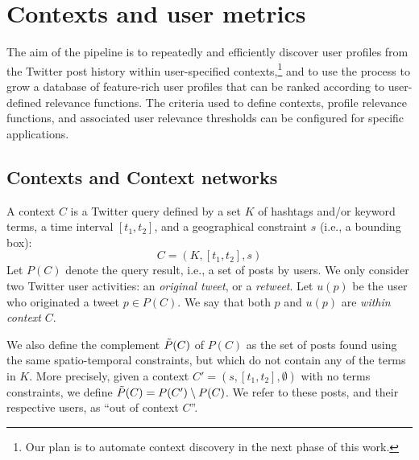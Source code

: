 \section{Contexts and user metrics}


The aim of the pipeline is to repeatedly and efficiently discover user profiles from the Twitter post history within user-specified contexts,\footnote{Our plan is to  automate context discovery in the next phase of this work.} and to use the process to grow a database of feature-rich user profiles that can be ranked according to user-defined relevance functions. 
The criteria used to define contexts, profile relevance functions, and associated user relevance thresholds can be configured for specific applications.

\subsection{Contexts and Context networks} \label{sec:contexts}

A context $C$ is a Twitter query defined by a set $K$ of hashtags and/or keyword terms, a time interval $[t_1, t_2]$, and a geographical constraint  $s$ (i.e., a bounding box):
\begin{equation}
C = (K, [t_1, t_2], s)
\label{eq:context}
\end{equation}
Let $P(C)$ denote the query result, i.e., a set of posts by users.
We only consider two Twitter user activities: an \textit{original tweet}, or a \textit{retweet}.
Let $u(p)$ be the user who originated a tweet $p \in P(C)$.
We say that both $p$ and $u(p)$ are \textit{within context} $C$.

We also define the complement $\Tilde{P}(C)$ of $P(C)$ as the set of posts found using the same spatio-temporal constraints, but which do not contain any of the terms in $K$. More precisely, given a context $C'= ( s, [t_1, t_2], \emptyset )$ with no terms constraints, we define $\Tilde{P}(C) = P(C') \setminus P(C)$. 
We refer to these posts, and their respective users, as ``out of context $C$''.

